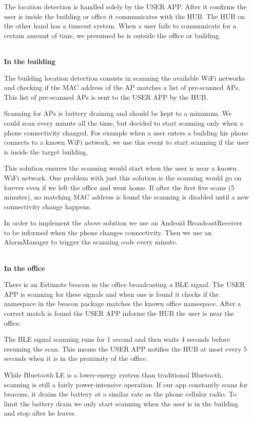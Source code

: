 The location detection is handled solely by the USER APP. After it confirms the user is inside the building or office it communicates with the HUB. The HUB on the other hand has a timeout system. When a user fails to communicate for a certain amount of time, we presumed he is outside the office or building.

\mbox{}\\
\textbf{In the building}

The building location detection consists in scanning the available \ac{WiFi} networks and checking if the \ac{MAC address} of the \ac{AP} matches a list of pre-scanned \ac{AP}s. This list of pre-scanned \ac{AP}s is sent to the USER APP by the HUB.  

Scanning for \ac{AP}s is battery draining and should be kept to a minimum. We could scan every minute all the time, but decided to start scanning only when a phone connectivity changed. For example when a user enters a building his phone connects to a known \ac{WiFi} network, we use this event to start scanning if the user is inside the target building.


This solution ensures the scanning would start when the user is near a known \ac{WiFi} network. One problem with just this solution is the scanning would go on forever even if we left the office and went home. If after the first five scans (5 minutes), no matching \ac{MAC address} is found the scanning is disabled until a new connectivity change happens. 


In order to implement the above solution we use an Android BroadcastReceiver to be informed when the phone changes connectivity. Then we use an AlarmManager to trigger the scanning code every minute.

\mbox{}\\
\textbf{In the office}

There is an Estimote beacon in the office broadcasting a \ac{BLE} signal. The USER APP is scanning for these signals and when one is found it checks if the namespace in the beacon package matches the known office namespace. After a correct match is found the USER APP informs the HUB the user is near the office.

The \ac{BLE} signal scanning runs for 1 second and then waits 4 seconds before resuming the scan. This means the USER APP notifies the HUB at most every 5 seconds when it is in the proximity of the office.

While Bluetooth LE is a lower-energy system than traditional Bluetooth, scanning is still a fairly power-intensive operation. If our app constantly scans for beacons, it drains the battery at a similar rate as the phone cellular radio. To limit the battery drain we only start scanning when the user is in the building and stop after he leaves.

